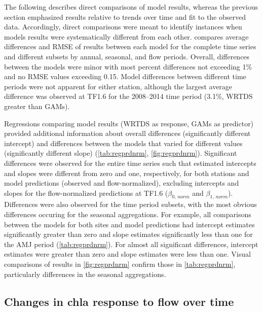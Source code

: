 \documentclass[letterpaper,12pt,oneside]{article}\usepackage[]{graphicx}\usepackage[]{color}
\begin{document}
The following describes direct comparisons of model results, whereas the previous section emphasized results relative to trends over time and fit to the observed data.  Accordingly, direct comparisons were meant to identify instances when models results were systematically different from each other.   compares average differences and \ac{RMSE} of results between each model for the complete time series and different subsets by annual, seasonal, and flow periods.  Overall, differences between the models were minor with most percent differences not exceeding 1\% and no \ac{RMSE} values exceeding 0.15.  Model differences between different time periods were not apparent for either station, although the largest average difference was observed at TF1.6 for the 2008--2014 time period (3.1\%, \ac{WRTDS} greater than \acp{GAM}).

Regressions comparing model results (\ac{WRTDS} as response, \acp{GAM} as predictor) provided additional information about overall differences (significantly different intercept) and differences between the models that varied for different values (significantly different slope) (\cref{tab:regprdnrm}, \cref{fig:regprdnrm}).  Significant differences were observed for the entire time series such that estimated intercepts and slopes were different from zero and one, respectively, for both stations and model predictions (observed and flow-normalized), excluding intercepts and slopes for the flow-normalized predictions at TF1.6 ($\beta_{0,\,norm}$ and $\beta_{1,\,norm}$).  Differences were also observed for the time period subsets, with the most obvious differences occuring for the seasonal aggregations.  For example, all comparisons between the models for both sites and model predictions had intercept estimates significantly greater than zero and slope estimates significantly less than one for the \ac{AMJ} period (\cref{tab:regprdnrm}). For almost all significant differences, intercept estimates were greater than zero and slope estimates were less than one.  Visual comparisons of results in \cref{fig:regprdnrm} confirm those in \cref{tab:regprdnrm}, particularly differences in the seasonal aggregations.

\subsection*{Changes in \ac{chla} response to flow over time}
\end{document}
